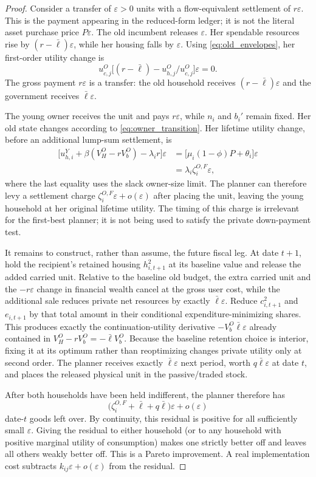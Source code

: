 \documentclass[11pt]{article}
\newcommand{\1}{\mathbf 1}
\newcommand{\ellbar}{\bar\ell}
\begin{document}
\begin{proof}
Consider a transfer of $\varepsilon>0$ units with a flow-equivalent settlement
of $r\varepsilon$. This is the payment appearing in the reduced-form ledger;
it is not the literal asset purchase price $P\varepsilon$.
The old incumbent releases $\varepsilon$. Her spendable resources rise by
$(r-\ellbar)\varepsilon$, while her housing falls by $\varepsilon$. Using
\eqref{eq:old_envelopes}, her first-order utility change is
\[
u_{c,j}^O\big[(r-\ellbar)-u_{h,j}^O/u_{c,j}^O\big]\varepsilon=0.
\]
The gross payment $r\varepsilon$ is a transfer: the old household receives
$(r-\ellbar)\varepsilon$ and the government receives
$\ellbar\varepsilon$.

The young owner receives the unit and pays $r\varepsilon$, while $n_i$ and
$b_i'$ remain fixed. Her old state changes according to
\eqref{eq:owner_transition}. Her lifetime utility change, before an additional
lump-sum settlement, is
\begin{align*}
\big[u_{h,i}^Y+\beta(V_H^O-rV_b^O)-\lambda_i r\big]\varepsilon
&=\big[\mu_i(1-\phi)P+\theta_i\big]\varepsilon\\
&=\lambda_i\zeta_i^{O,F}\varepsilon,
\end{align*}
where the last equality uses the slack owner-size limit. The planner can
therefore levy a settlement charge
$\zeta_i^{O,F}\varepsilon+o(\varepsilon)$ after placing the unit, leaving the
young household at her original lifetime utility. The timing of this charge
is irrelevant for the first-best planner; it is not being used to satisfy the
private down-payment test.

It remains to construct, rather than assume, the future fiscal leg. At date
$t+1$, hold the recipient's retained housing $h_{i,t+1}^2$ at its baseline
value and release the added carried unit. Relative to the baseline old budget,
the extra carried unit and the $-r\varepsilon$ change in financial wealth
cancel at the gross user cost, while the additional sale reduces private net
resources by exactly $\ellbar\varepsilon$. Reduce $c_{i,t+1}^2$ and
$e_{i,t+1}$ by that total amount in their conditional expenditure-minimizing
shares. This produces exactly the continuation-utility derivative
$-V_b^O\ellbar\varepsilon$ already contained in
$V_H^O-rV_b^O=-\ellbar V_b^O$. Because the baseline retention choice is
interior, fixing it at its optimum rather than reoptimizing changes private
utility only at second order. The planner receives exactly
$\ellbar\varepsilon$ next period, worth $q\ellbar\varepsilon$ at date $t$,
and places the released physical unit in the passive/traded stock.

After both households have been held indifferent, the planner therefore has
\[
\big(\zeta_i^{O,F}+\ellbar+q\ellbar\big)\varepsilon
+o(\varepsilon)
\]
date-$t$ goods left over. By continuity, this residual is positive for all
sufficiently small $\varepsilon$. Giving the residual to either household (or
to any household with positive marginal utility of consumption) makes one
strictly better off and leaves all others weakly better off. This is a Pareto
improvement. A real implementation cost subtracts
$k_{ij}\varepsilon+o(\varepsilon)$ from the residual.
\end{proof}
\end{document}
